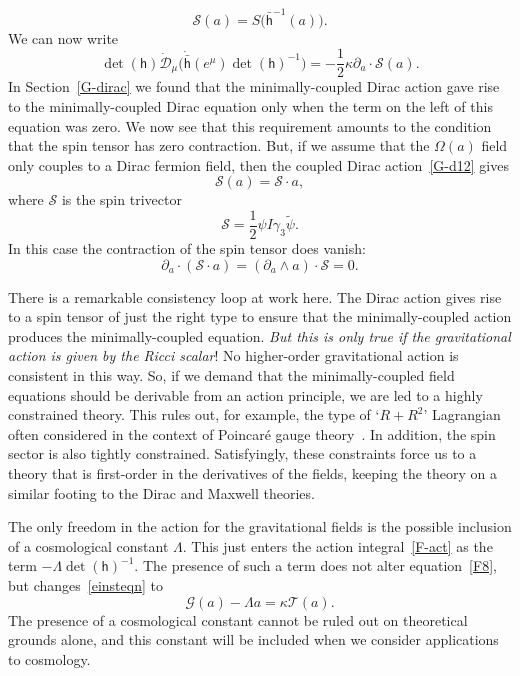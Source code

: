 \documentclass[a4paper]{article}
\numberwithin{equation}{section}
\newcommand{\dt}{\! \cdot \!}
\newcommand{\wdg}{\! \wedge \!}
\newcommand{\half}{{\textstyle \frac{1}{2}}}
\newcommand{\eqv}{=}
\newcommand{\kap}{\kappa}
\newcommand{\Lam}{\Lambda}
\newcommand{\Om}{\Omega}
\newcommand{\cld}{{\mathcal{D}}}
\newcommand{\clg}{{\mathcal{G}}}
\newcommand{\cls}{{\mathcal{S}}}
\newcommand{\clt}{{\mathcal{T}}}
\newcommand{\da}{\partial_a}
\newcommand{\gk}{\gamma_{3}}
\newcommand{\psirev}{\tilde{\psi}}
\newcommand{\lih}{\mathsf{h}}
\newcommand{\lbh}{\bar{\mathsf{h}}}
\newcommand{\ho}{\lbh}
\newcommand{\hu}{\lih}
\newcommand{\dhi}{\det(\hu)^{-1}}
\renewcommand{\dh}{\det(\hu)}
\begin{document}
%
\begin{equation}
\cls(a) \eqv S \bigl(\ho^{-1}(a) \bigr).
\end{equation}
%
We can now write
%
\begin{equation}
\dh \dot{\cld}_\mu \bigl( \dot{\ho}(e^\mu) \dhi \bigr) = - \half \kap
\da \dt \cls(a). 
\end{equation} 
%
In Section~\ref{G-dirac} we found that the minimally-coupled Dirac
action gave rise to the minimally-coupled Dirac equation only when the
term on the left of this equation was zero.  We now see that this
requirement amounts to the condition that the spin tensor has zero
contraction.  But, if we assume that the $\Om(a)$ field only couples
to a Dirac fermion field, then the coupled Dirac action~\eqref{G-d12}
gives
%
\begin{equation}
\cls(a) = \cls \dt a,
\end{equation}
%
where $\cls$ is the spin trivector
%
\begin{equation}
\cls= \half \psi I\gk \psirev.
\end{equation}
%
In this case the contraction of the spin tensor does vanish:
%
\begin{equation}
\da \dt (\cls \dt a) = (\da \wdg a) \dt \cls = 0.
\end{equation} 
%


There is a remarkable consistency loop at work here.  The Dirac action
gives rise to a spin tensor of just the right type to ensure that the
minimally-coupled action produces the minimally-coupled equation.
\textit{But this is only true if the gravitational action is given by
the Ricci scalar}!  No higher-order gravitational action is consistent
in this way.  So, if we demand that the minimally-coupled field
equations should be derivable from an action principle, we are led to
a highly constrained theory.  This rules out, for example, the type of
`$R+R^2$' Lagrangian often considered in the context of Poincar\'{e}
gauge theory~\cite{rau82,hec91,kho92}.  In addition, the spin sector
is also tightly constrained. Satisfyingly, these constraints force us
to a theory that is first-order in the derivatives of the fields,
keeping the theory on a similar footing to the Dirac and Maxwell
theories.


The only freedom in the action for the gravitational fields is the
possible inclusion of a cosmological constant $\Lambda$.  This just
enters the action integral~\eqref{F-act} as the term $-\Lambda\dhi$.  The
presence of such a term does not alter equation~\eqref{F8}, but
changes~\eqref{einsteqn} to
%
\begin{equation}
\clg(a) - \Lam a = \kap \clt(a).
\end{equation}
%
The presence of a cosmological constant cannot be ruled out on
theoretical grounds alone, and this constant will be included when we
consider applications to cosmology.
\end{document}
